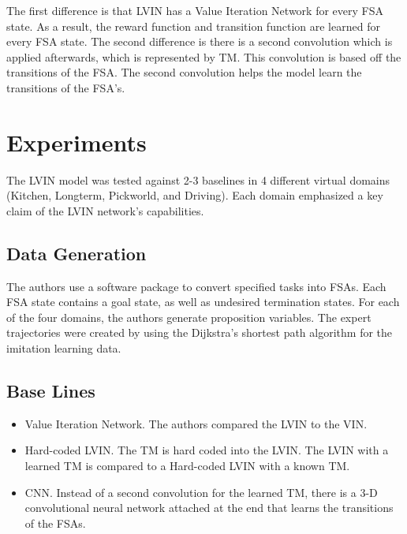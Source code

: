 \documentclass[letterpaper, 10 pt, conference]{ieeeconf}  %
\begin{document}
The first difference is that LVIN has a Value Iteration Network for every FSA state. As a result, the reward function and transition function are learned for every FSA state.
\newline 
\indent The second difference is there is a second convolution which is applied afterwards, which is represented by TM. This convolution is based off the transitions of the FSA. The second convolution helps the model learn the transitions of the FSA's.

\section{Experiments}
The LVIN model was tested against 2-3 baselines in 4 different virtual domains (Kitchen, Longterm, Pickworld, and Driving). Each domain emphasized a key claim of the LVIN network's capabilities. 

\subsection{Data Generation}

The authors use a software package to convert specified tasks into FSAs. Each FSA state contains a goal state, as well as undesired termination states. For each of the four domains, the authors generate proposition variables. The expert trajectories were created by using the Dijkstra's shortest path algorithm for the imitation learning data.

\subsection{Base Lines}

\begin{itemize}
  \item Value Iteration Network. The authors compared the LVIN to the VIN.
  \item Hard-coded LVIN. The TM is hard coded into the LVIN. The LVIN with a learned TM is compared to a Hard-coded LVIN with a known TM.
  \item CNN. Instead of a second convolution for the learned TM, there is a 3-D convolutional neural network attached at the end that learns the transitions of the FSAs.
\end{itemize}
\end{document}
